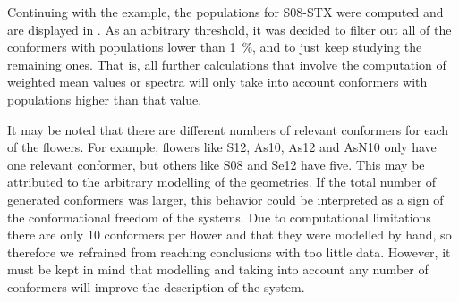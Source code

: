 Continuing with the example, the populations for S08-STX were computed and are displayed in .
As an arbitrary threshold, it was decided to filter out all of the conformers with populations lower than \SI{1}{\percent}, and to just keep studying the remaining ones.
That is, all further calculations that involve the computation of weighted mean values or spectra will only take into account conformers with populations higher than that value.

It may be noted that there are different numbers of relevant conformers for each of the flowers.
For example, flowers like S12, As10, As12 and AsN10 only have one relevant conformer, but others like S08 and Se12 have five.
This may be attributed to the arbitrary modelling of the geometries.
If the total number of generated conformers was larger, this behavior could be interpreted as a sign of the conformational freedom of the systems.
Due to computational limitations there are only 10 conformers per flower and that they were modelled by hand, so therefore we refrained from reaching conclusions with too little data.
However, it must be kept in mind that modelling and taking into account any number of conformers will improve the description of the system.

